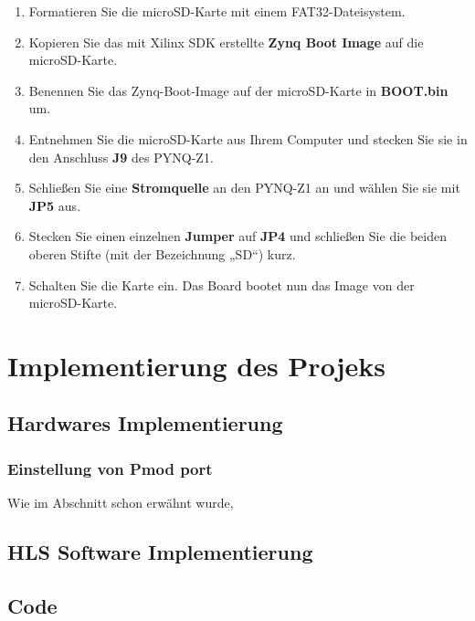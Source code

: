 \documentclass[a4paper]{report}
\begin{document}
	\begin{enumerate} 
	
		\item Formatieren Sie die microSD-Karte mit einem FAT32-Dateisystem.
		\item Kopieren Sie das mit Xilinx SDK erstellte \textbf{Zynq Boot Image} auf die microSD-Karte.
		\item Benennen Sie das Zynq-Boot-Image auf der microSD-Karte in\textbf{ BOOT.bin }um.
		\item Entnehmen Sie die microSD-Karte aus Ihrem Computer und stecken Sie sie in den Anschluss\textbf{ J9} des PYNQ-Z1.
		\item Schließen Sie eine\textbf{ Stromquelle} an den PYNQ-Z1 an und wählen Sie sie mit\textbf{ JP5 }aus.
		\item Stecken Sie einen einzelnen\textbf{ Jumper} auf \textbf{ JP4 } und schließen Sie die beiden oberen Stifte (mit der Bezeichnung „SD“) kurz.
		\item Schalten Sie die Karte ein. Das Board bootet nun das Image von der microSD-Karte.

	\end{enumerate}


\chapter{Implementierung des Projeks}
\label{Implementierung_des_Projeks}


\section{Hardwares Implementierung}

\subsection{Einstellung von Pmod port}
Wie im Abschnitt \textbf{} schon erwähnt wurde, 


\section{HLS Software Implementierung}




\section{Code}
\end{document}
